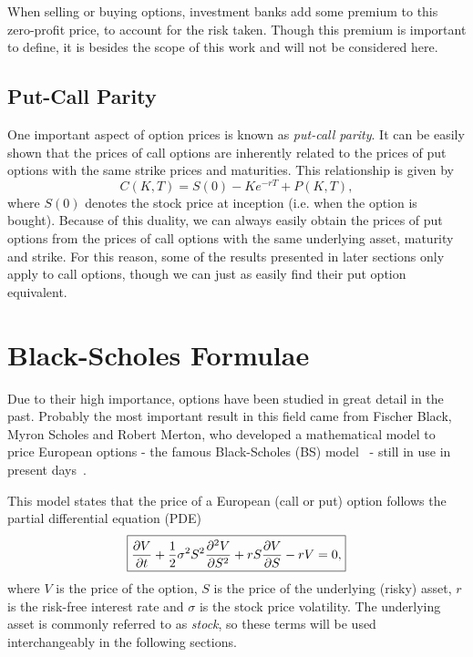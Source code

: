 When selling or buying options, investment banks add some premium to this zero-profit price, to account for the risk taken. Though this premium is important to define, it is besides the scope of this work and will not be considered here.

\subsection{Put-Call Parity}
One important aspect of option prices is known as \emph{put-call parity}. It can be easily shown that the prices of call options are inherently related to the prices of put options with the same strike prices and maturities. This relationship is given by
\begin{equation}
C(K,T)=S(0)-Ke^{-rT}+P(K,T),
\end{equation}
\noindent where $S(0)$ denotes the stock price at inception (i.e. when the option is bought).
Because of this duality, we can always easily obtain the prices of put options from the prices of call options with the same underlying asset, maturity and strike. For this reason, some of the results presented in later sections only apply to call options, though we can just as easily find their put option equivalent.
    
\section{Black-Scholes Formulae}
\label{section:Black-Scholes Formulae}
Due to their high importance, options have been studied in great detail in the past.
Probably the most important result in this field came from Fischer Black, Myron Scholes and Robert Merton, who developed a mathematical model to price European options - the famous Black-Scholes (BS) model~\citep{Scholes} - still in use in present days~\citep{Wilmott3}.

This model states that the price of a European (call or put) option follows the partial differential equation (PDE)
\begin{equation}\label{BS2}
\boxed{\pdv{V}{t}+\frac{1}{2}\sigma^2S^2\pdv{^2V}{S^2}+rS\pdv{V}{S}-rV=0,}
\end{equation}
\noindent where $V$ is the price of the option, $S$ is the price of the underlying (risky) asset, $r$ is the risk-free interest rate and $\sigma$ is the stock price volatility.
The underlying asset is commonly referred to as \emph{stock}, so these terms will be used interchangeably in the following sections.

